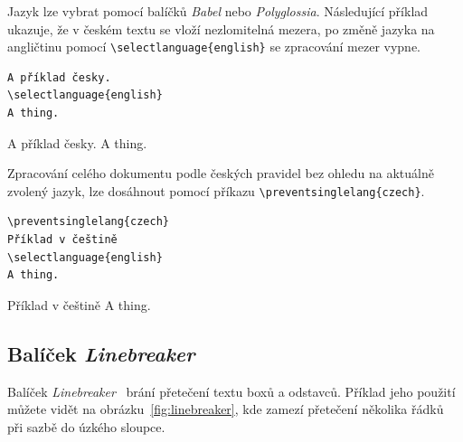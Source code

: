 \documentclass{csbulletin}
\newcommand\balicek[1]{\textit{#1}}
\begin{document}
Jazyk lze  vybrat pomocí balíčků \balicek{Babel} nebo \balicek{Polyglossia}. Následující příklad
ukazuje, že v českém textu se vloží nezlomitelná mezera, po změně jazyka na angličtinu pomocí
\verb|\selectlanguage{english}| se zpracování mezer vypne. 
  


\begin{verbatim}
A příklad česky.
\selectlanguage{english}
A thing.
\end{verbatim}

\preventsingledebugon

\noindent 
A příklad česky.
A thing.

\preventsingledebugoff



\bigskip

Zpracování celého dokumentu podle českých pravidel bez ohledu na aktuálně zvolený jazyk, lze dosáhnout pomocí příkazu 
\verb|\preventsinglelang{czech}|.

\begin{verbatim}
\preventsinglelang{czech}
Příklad v češtině
\selectlanguage{english}
A thing.
\end{verbatim}

\preventsingledebugon

\noindent Příklad v češtině
A thing.

\preventsingledebugoff
{}

\subsection{Balíček \balicek{Linebreaker}}

\newcommand\testbox[1]{%
  \parbox{120pt}{%
    \parindent=15pt%
    \tolerance=1%
    \pretolerance=1%
    #1
  }%
}


\newcommand\printtest[1]{%
  \linebreakerdisable%
  \begin{subfigure}[b]{.45\textwidth}
    \centering
  \noindent\testbox{%
    #1
  }%
  \caption{Bez balíčku \balicek{Linebreaker}}
  \end{subfigure}
  \linebreakerenable%
  \hfill%
  \begin{subfigure}[b]{.45\textwidth}
    \centering
  \testbox{%
    #1
  }%
  \medskip
  \caption{S balíčkem \balicek{Linebreaker}}
  \end{subfigure}
}

Balíček \balicek{Linebreaker}~\cite{linebreaker} brání přetečení textu boxů a odstavců. 
Příklad jeho použití můžete vidět na obrázku~\ref{fig:linebreaker}, kde zamezí přetečení 
několika řádků při sazbě do úzkého sloupce. 
\end{document}
